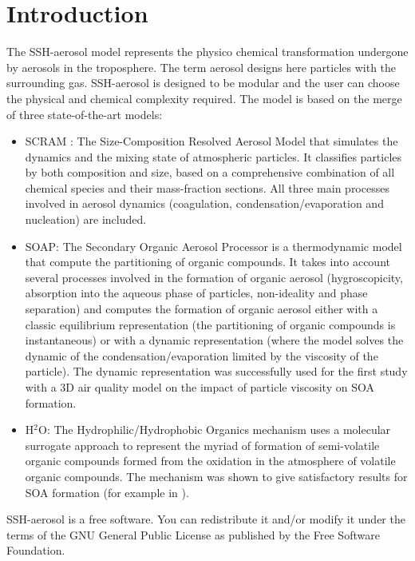 \documentclass[a4paper,11pt]{article}
\begin{document}
\section{Introduction}
The SSH-aerosol model represents the physico chemical transformation undergone by aerosols in the troposphere. The term aerosol designs here particles with the surrounding gas. SSH-aerosol is designed to be modular and the user can choose the physical and chemical complexity required.
The model is based on the merge of three state-of-the-art models:
\begin{itemize}
\item SCRAM : The Size-Composition Resolved Aerosol Model \cite{zhu2015} that simulates the dynamics and the mixing state of atmospheric particles. It classifies particles by both composition and size, based on a comprehensive combination of all chemical species and their mass-fraction sections. All three main processes involved in aerosol dynamics (coagulation, condensation/evaporation and nucleation) are included.
\item SOAP: The Secondary Organic Aerosol Processor \cite{couvidat2015} is a thermodynamic model that compute the partitioning of organic compounds. It takes into account several processes involved in the formation of organic aerosol (hygroscopicity, absorption into the aqueous phase of particles, non-ideality and phase separation) and computes the formation of organic aerosol either with a classic equilibrium representation (the partitioning of organic compounds is instantaneous) or with a dynamic representation (where the model solves the dynamic of the condensation/evaporation limited by the viscosity of the particle). The dynamic representation was successfully used \cite{kim2019} for the first study with a 3D air quality model on the impact of particle viscosity on SOA formation.
\item H$^2$O: The Hydrophilic/Hydrophobic Organics \cite{couvidat2012} mechanism uses a molecular surrogate approach to represent the myriad of formation of semi-volatile organic compounds formed from the oxidation in the atmosphere of volatile organic compounds. The mechanism was shown to give satisfactory results for SOA formation (for example in \cite{kim2019}).
\end{itemize}

SSH-aerosol is a free software. You can redistribute it and/or modify it under the terms of the GNU General Public License as published by the Free Software Foundation.
\end{document}
